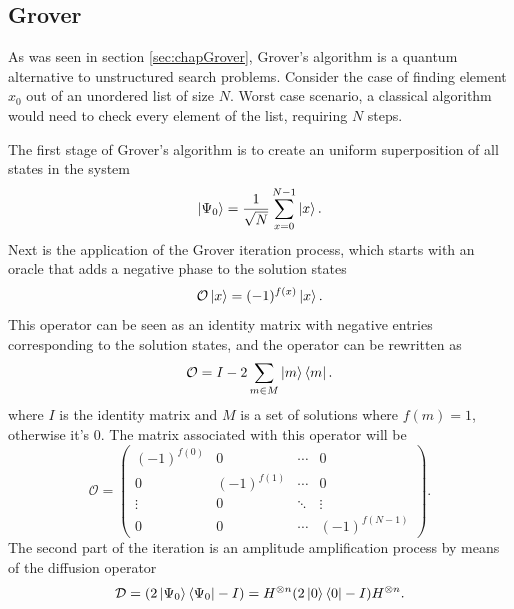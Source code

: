 \documentclass[../../dissertation.tex]{subfiles}
\begin{document}
\subsection{Grover}
As was seen in section \ref{sec:chapGrover}, Grover's algorithm is a quantum alternative to unstructured search problems. Consider the case of finding element $x_0$ out of an unordered list of size $N$. Worst case scenario, a classical algorithm would need to check every element of the list, requiring $N$ steps.\par
The first stage of Grover's algorithm is to create an uniform superposition of all states in the system
\begin{equation}
	\ket{\Psi_0}  = \frac{1}{\sqrt{N}}\sum_{x=0}^{N-1} \ket{x}.
\end{equation}
Next is the application of the Grover iteration process, which starts with an oracle that adds a negative phase to the solution states
\begin{equation}
        \mathcal{O}\ket{x} = (-1)^{f(x)}\ket{x}.
\end{equation}
This operator can be seen as an identity matrix with negative entries corresponding to the solution states, and the operator can be rewritten as 
\begin{equation}
	\mathcal{O} = I - 2\sum_{m\in M} \ket{m}\bra{m}.
	\label{eq:groverQiskitOracle}
\end{equation}
where $I$ is the identity matrix and $M$ is a set of solutions where $f(m) = 1$, otherwise it's $0$. The matrix associated with this operator will be
\begin{equation}
	\mathcal{O} = 
	\begin{pmatrix}
		(-1)^{f(0)} & 0 & \cdots & 0\\
	        0 & (-1)^{f(1)} & \cdots & 0\\ 
	        \vdots & 0 &  \ddots & \vdots\\ 
		0 & 0 & \cdots &  (-1)^{f(N-1)}
	\end{pmatrix}.
	\label{eq:oracleMatrixQiskit}
\end{equation}
The second part of the iteration is an amplitude amplification process by means of the diffusion operator 
\begin{equation}
        \mathcal{D} = (2\ket{\Psi_0}\bra{\Psi_0} - I) = H^{\otimes n}(2\ket{0}\bra{0} - I)H^{\otimes n}.
	\label{eq:groverQiskitDiffusion}
\end{equation}
\end{document}
